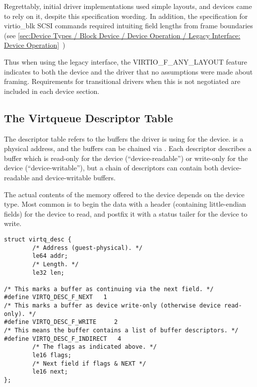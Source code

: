 Regrettably, initial driver implementations used simple layouts, and
devices came to rely on it, despite this specification wording.  In
addition, the specification for virtio_blk SCSI commands required
intuiting field lengths from frame boundaries (see
 \ref{sec:Device Types / Block Device / Device Operation / Legacy Interface: Device Operation}~)

Thus when using the legacy interface, the VIRTIO_F_ANY_LAYOUT
feature indicates to both the device and the driver that no
assumptions were made about framing.  Requirements for
transitional drivers when this is not negotiated are included in
each device section.

\subsection{The Virtqueue Descriptor Table}\label{sec:Basic Facilities of a Virtio Device / Virtqueues / The Virtqueue Descriptor Table}

The descriptor table refers to the buffers the driver is using for
the device.  is a physical address, and the buffers
can be chained via . Each descriptor describes a
buffer which is read-only for the device (``device-readable'') or write-only for the device (``device-writable''), but a chain of
descriptors can contain both device-readable and device-writable buffers.

The actual contents of the memory offered to the device depends on the
device type.  Most common is to begin the data with a header
(containing little-endian fields) for the device to read, and postfix
it with a status tailer for the device to write.

\begin{lstlisting}
struct virtq_desc {
        /* Address (guest-physical). */
        le64 addr;
        /* Length. */
        le32 len;

/* This marks a buffer as continuing via the next field. */
#define VIRTQ_DESC_F_NEXT   1
/* This marks a buffer as device write-only (otherwise device read-only). */
#define VIRTQ_DESC_F_WRITE     2
/* This means the buffer contains a list of buffer descriptors. */
#define VIRTQ_DESC_F_INDIRECT   4
        /* The flags as indicated above. */
        le16 flags;
        /* Next field if flags & NEXT */
        le16 next;
};
\end{lstlisting}


